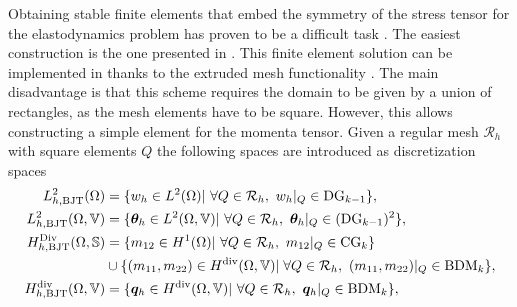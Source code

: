 Obtaining stable finite elements that embed the symmetry of the stress tensor for the elastodynamics problem has proven to be a difficult task \cite{arnold2002mixed}. The easiest construction is the one presented in \cite{becache2001elas}. This finite element solution can be implemented in {} \cite{rathgeber2017firedrake} thanks to the extruded mesh functionality \cite{mcrae2016}.  The main disadvantage is that this scheme requires the domain to be given by a union of rectangles, as the mesh elements have to be square. However, this allows constructing a simple element for the momenta tensor. Given a regular mesh $\mathcal{R}_h$ with square elements $Q$ the following spaces are introduced as discretization spaces
\begin{equation}
\label{eq:BTJ}
\begin{aligned}
L_{h, \text{BJT}}^2(\Omega) &= \{w_h \in L^2(\Omega) | \ \forall Q \in \mathcal{R}_h, \ w_h|_{Q} \in \mathrm{DG}_{k-1} \}, \\
L_{h, \text{BJT}}^2(\Omega, \mathbb{V}) &= \{\bm{\theta}_h \in L^2(\Omega, \mathbb{V}) | \ \forall Q \in \mathcal{R}_h,\ \bm{\theta}_h|_{Q} \in (\mathrm{DG}_{k-1})^2 \}, \\
H_{h, \text{BJT}}^{\Div}(\Omega, \mathbb{S}) &= \{m_{12} \in H^1(\Omega)| \ \forall Q \in \mathcal{R}_h,\ m_{12}|_{Q} \in \mathrm{CG}_{k} \}  \\
&\cup \{(m_{11}, m_{22}) \in H^{\div}(\Omega, \mathbb{V})| \; \forall Q\in \mathcal{R}_h,\ (m_{11}, m_{22})|_{Q} \in \mathrm{BDM}_{k} \}, \\
H_{h, \text{BJT}}^{\div}(\Omega, \mathbb{V}) &= \{\bm{q}_h \in H^{\div}(\Omega, \mathbb{V}) | \ \forall Q\in \mathcal{R}_h,\ \bm{q}_h|_{Q} \in \mathrm{BDM}_{k} \}, \\ 
\end{aligned}
\end{equation}

